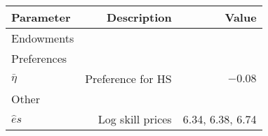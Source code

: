 \begin{tabular}{lrr}
\hline
Parameter & Description  & Value  \\ 
\hline
Endowments &   &   \\ 
Preferences &   &   \\ 
$\bar{\eta}$ & Preference for HS  & $-0.08$  \\ 
Other &   &   \\ 
$\hat{e}{s}$ & Log skill prices  & 6.34, 6.38, 6.74  \\ 
\hline
\end{tabular}%

